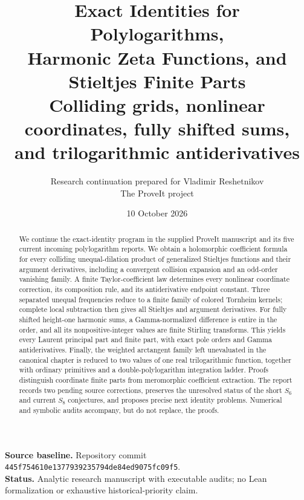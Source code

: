 \documentclass[11pt,a4paper]{article}
\title{\vspace{-7mm}\textbf{Exact Identities for Polylogarithms,\\
Harmonic Zeta Functions, and\\Stieltjes Finite Parts}\\[4mm]
\large Colliding grids, nonlinear coordinates, fully shifted sums,\\
and trilogarithmic antiderivatives}
\author{Research continuation prepared for Vladimir Reshetnikov\\
\small The ProveIt project}
\date{10 October 2026}
\numberwithin{equation}{section}
\theoremstyle{definition}
\theoremstyle{remark}
\begin{document}
\maketitle
\thispagestyle{empty}
\begin{abstract}
We continue the exact-identity program in the supplied ProveIt manuscript
and its five current incoming polylogarithm reports. We obtain a
holomorphic coefficient formula for every colliding unequal-dilation
product of generalized Stieltjes functions and their argument derivatives,
including a convergent collision expansion and an odd-order vanishing
family. A finite Taylor-coefficient law determines every nonlinear
coordinate correction, its composition rule, and its antiderivative
endpoint constant. Three separated unequal frequencies reduce to a finite
family of colored Tornheim kernels; complete local subtraction then gives
all Stieltjes and argument derivatives. For fully shifted height-one
harmonic sums, a Gamma-normalized difference is entire in the order, and
all its nonpositive-integer values are finite Stirling transforms. This
yields every Laurent principal part and finite part, with exact pole
orders and Gamma antiderivatives. Finally, the weighted arctangent family
left unevaluated in the canonical chapter is reduced to two values of one
real trilogarithmic function, together with ordinary primitives and a
double-polylogarithm integration ladder. Proofs distinguish coordinate
finite parts from meromorphic coefficient extraction. The report records
two pending source corrections, preserves the unresolved status of the
short $S_6$ and current $S_8$ conjectures, and proposes precise next
identity problems. Numerical and symbolic audits accompany, but do not
replace, the proofs.
\end{abstract}
\vfill
\noindent\textbf{Source baseline.} Repository commit
\texttt{445f754610e1377939235794de84ed9075fc09f5}.\\
\textbf{Status.} Analytic research manuscript with executable audits;
no Lean formalization or exhaustive historical-priority claim.
\clearpage
\begingroup
\small
\setlength{\parskip}{0pt}
\tableofcontents
\endgroup
\clearpage








\clearpage

\end{document}
